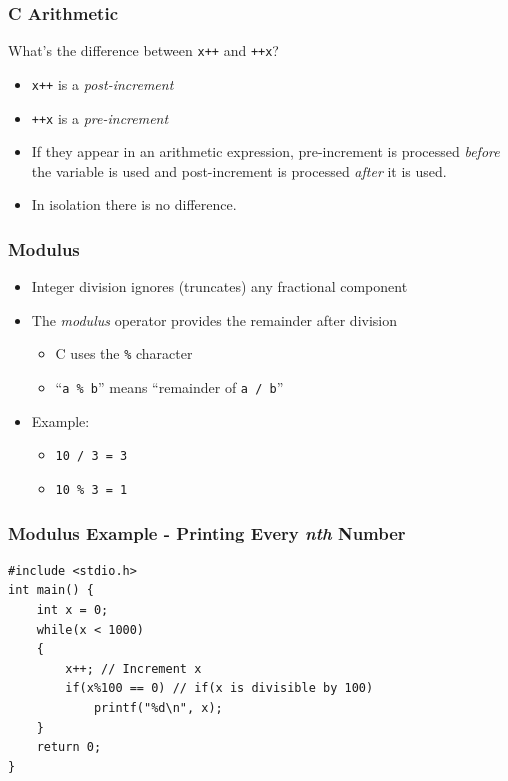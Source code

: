 \documentclass[14pt]{beamer}
\begin{document}
\begin{frame}
\frametitle{C Arithmetic}
What's the difference between \texttt{x++} and \texttt{++x}?
\begin{itemize}
\item \texttt{x++} is a \textit{post-increment}
\item \texttt{++x} is a \textit{pre-increment}
\item If they appear in an arithmetic expression, pre-increment is processed \textit{before} the variable is used and post-increment is processed \textit{after} it is used.
\item In isolation there is no difference.
\end{itemize}
\end{frame}



\begin{frame}
\frametitle{Modulus}
\begin{itemize}
\item Integer division ignores (truncates) any fractional component
\item The \textit{modulus} operator provides the remainder after division
\begin{itemize}
	\item C uses the \texttt{\%} character
	\item ``\texttt{a \% b}'' means ``remainder of \texttt{a / b}''
\end{itemize}
\item Example:
	\begin{itemize}	
		\item \texttt{10 / 3 = 3}
		\item \texttt{10 \% 3 = 1}
	\end{itemize}
\end{itemize}
\end{frame}

\begin{frame}[fragile]
\frametitle{Modulus Example - Printing Every \textit{nth} Number}
\begin{lstlisting}[style=CStyle]
#include <stdio.h>
int main() {
	int x = 0;
	while(x < 1000)
	{
		x++; // Increment x
		if(x%100 == 0) // if(x is divisible by 100)
			printf("%d\n", x);
	}
	return 0;
}
\end{lstlisting}
\end{frame}
\end{document}
